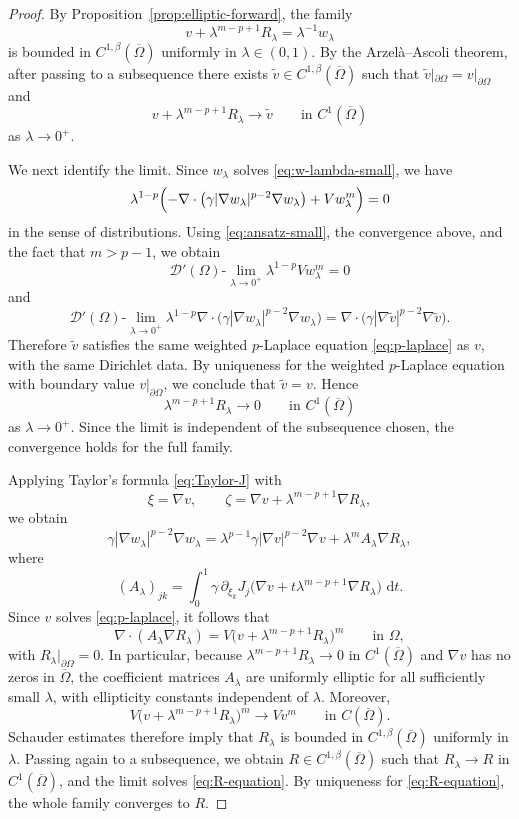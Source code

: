 \documentclass[10pt,a4paper]{amsart}
\newcommand{\dd}{\,\mathrm{d}}
\newcommand{\pr}{\partial}
\begin{document}
\begin{proof}
By Proposition~\ref{prop:elliptic-forward}, the family
\[
v+\lambda^{m-p+1}R_\lambda=\lambda^{-1}w_\lambda
\]
is bounded in $C^{1,\beta}(\overline\Omega)$ uniformly in $\lambda\in(0,1)$. By the Arzel\`a--Ascoli theorem, after passing to a subsequence there exists $\tilde v\in C^{1,\beta}(\overline\Omega)$ such that $\tilde v|_{\pr\Omega}=v|_{\pr\Omega}$ and
\[
v+\lambda^{m-p+1}R_\lambda\to \tilde v
\qquad\text{in }C^1(\overline\Omega)
\]
as $\lambda\to0^+$.

We next identify the limit. Since $w_\lambda$ solves \eqref{eq:w-lambda-small}, we have
\[
\lambda^{1-p}\Bigl(-\nabla\cdot\bigl(\gamma|\nabla w_\lambda|^{p-2}\nabla w_\lambda\bigr)+Vw_\lambda^m\Bigr)=0
\]
in the sense of distributions. Using \eqref{eq:ansatz-small}, the convergence above, and the fact that $m>p-1$, we obtain
\[
\mathscr D'(\Omega)\text{-}\lim_{\lambda\to0^+}\lambda^{1-p}Vw_\lambda^m=0
\]
and
\[
\mathscr D'(\Omega)\text{-}\lim_{\lambda\to0^+}\lambda^{1-p}\nabla\cdot\bigl(\gamma|\nabla w_\lambda|^{p-2}\nabla w_\lambda\bigr)
=\nabla\cdot\bigl(\gamma|\nabla\tilde v|^{p-2}\nabla\tilde v\bigr).
\]
Therefore $\tilde v$ satisfies the same weighted $p$-Laplace equation \eqref{eq:p-laplace} as $v$, with the same Dirichlet data. By uniqueness for the weighted $p$-Laplace equation with boundary value $v|_{\pr\Omega}$, we conclude that $\tilde v=v$. Hence
\[
\lambda^{m-p+1}R_\lambda\to0
\qquad\text{in }C^1(\overline\Omega)
\]
as $\lambda\to0^+$. Since the limit is independent of the subsequence chosen, the convergence holds for the full family.

Applying Taylor's formula \eqref{eq:Taylor-J} with
\[
\xi=\nabla v,
\qquad
\zeta=\nabla v+\lambda^{m-p+1}\nabla R_\lambda,
\]
we obtain
\[
\gamma|\nabla w_\lambda|^{p-2}\nabla w_\lambda
=\lambda^{p-1}\gamma|\nabla v|^{p-2}\nabla v+\lambda^m A_\lambda\nabla R_\lambda,
\]
where
\[
(A_\lambda)_{jk}=\int_0^1\gamma\,\pr_{\xi_k}J_j\bigl(\nabla v+t\lambda^{m-p+1}\nabla R_\lambda\bigr)\,\dd t.
\]
Since $v$ solves \eqref{eq:p-laplace}, it follows that
\[
\nabla\cdot(A_\lambda\nabla R_\lambda)=V\bigl(v+\lambda^{m-p+1}R_\lambda\bigr)^m
\qquad\text{in }\Omega,
\]
with $R_\lambda|_{\pr\Omega}=0$. In particular, because $\lambda^{m-p+1}R_\lambda\to0$ in $C^1(\overline\Omega)$ and $\nabla v$ has no zeros in $\overline\Omega$, the coefficient matrices $A_\lambda$ are uniformly elliptic for all sufficiently small $\lambda$, with ellipticity constants independent of $\lambda$. Moreover,
\[
V\bigl(v+\lambda^{m-p+1}R_\lambda\bigr)^m\to Vv^m
\qquad\text{in }C(\overline\Omega).
\]
Schauder estimates therefore imply that $R_\lambda$ is bounded in $C^{1,\beta}(\overline\Omega)$ uniformly in $\lambda$. Passing again to a subsequence, we obtain $R\in C^{1,\beta}(\overline\Omega)$ such that $R_\lambda\to R$ in $C^1(\overline\Omega)$, and the limit solves \eqref{eq:R-equation}. By uniqueness for \eqref{eq:R-equation}, the whole family converges to $R$.


\end{proof}
\end{document}
